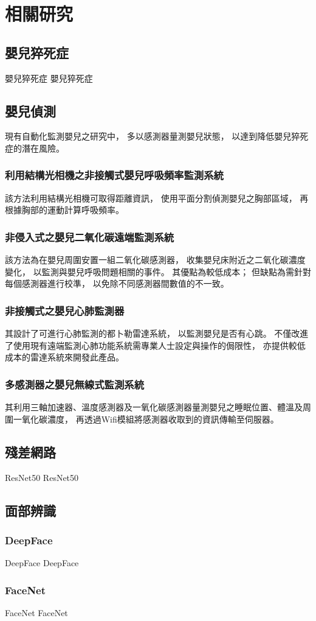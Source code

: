 \documentclass[class=NCU_thesis, crop=false]{standalone}
\begin{document}
\chapter{相關研究}

\section{嬰兒猝死症}
嬰兒猝死症 嬰兒猝死症

\section{嬰兒偵測}
現有自動化監測嬰兒之研究中，
多以感測器量測嬰兒狀態，
以達到降低嬰兒猝死症的潛在風險。

\subsection{利用結構光相機之非接觸式嬰兒呼吸頻率監測系統}
該方法利用結構光相機可取得距離資訊，
使用平面分割偵測嬰兒之胸部區域，
再根據胸部的運動計算呼吸頻率。

\subsection{非侵入式之嬰兒二氧化碳遠端監測系統}
該方法為在嬰兒周圍安置一組二氧化碳感測器，
收集嬰兒床附近之二氧化碳濃度變化，
以監測與嬰兒呼吸問題相關的事件。
其優點為較低成本；
但缺點為需針對每個感測器進行校準，
以免除不同感測器間數值的不一致。

\subsection{非接觸式之嬰兒心肺監測器}
其設計了可進行心肺監測的都卜勒雷達系統，
以監測嬰兒是否有心跳。
不僅改進了使用現有遠端監測心肺功能系統需專業人士設定與操作的侷限性，
亦提供較低成本的雷達系統來開發此產品。

\subsection{多感測器之嬰兒無線式監測系統}
其利用三軸加速器、溫度感測器及一氧化碳感測器量測嬰兒之睡眠位置、體溫及周圍一氧化碳濃度，
再透過Wifi模組將感測器收取到的資訊傳輸至伺服器。

\section{殘差網路}
ResNet50 ResNet50

\section{面部辨識}
\subsection{DeepFace}
DeepFace DeepFace

\subsection{FaceNet}
FaceNet FaceNet
\end{document}
